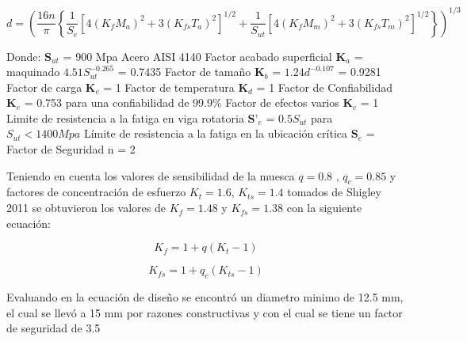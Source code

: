 \begin{equation}
    d = \left( \frac{16n}{\pi} \left\{ \frac{1}{S_e} [4(K_f M_a)^2 + 3(K_{fs} T_a)^2]^{1/2}   +       
                    \frac{1}{S_{ut}} [4(K_f M_m)^2 + 3(K_{fs} T_m)^2]^{1/2}     \right\} \right)^{1/3}
\end{equation}

Donde:\newline
$\textbf{S}_{ut}$ = 900 Mpa Acero AISI 4140\newline
Factor acabado superficial  $\textbf{K}_{a}$ = maquinado $4.51S_{ut}^{-0.265}$ = 0.7435 \newline
Factor de tamaño $\textbf{K}_{b}$ =  $1.24d^{-0.107}$ = 0.9281 \newline
Factor de carga $\textbf{K}_{c}$ = 1 \newline
Factor de temperatura $\textbf{K}_{d}$ = 1 \newline
Factor de Confiabilidad $\textbf{K}_{e}$ = 0.753    para una confiabilidad de 99.9\%\newline
Factor de efectos varios $\textbf{K}_{c}$ = 1 \newline
Limite de resistencia a la fatiga en viga rotatoria $\textbf{S'}_{e}$ = $0.5S_{ut}$ para $S_{ut} < 1400 Mpa$ \newline
Límite de resistencia a la fatiga en la ubicación crítica $\textbf{S}_{e}$ =\newline
Factor de Seguridad n = 2 \newline

Teniendo en cuenta los valores de sensibilidad de la muesca $q = 0.8$ , $ q_c = 0.85$ y factores de concentración de esfuerzo $K_t = 1.6$, $K_{ts} = 1.4$ tomados de Shigley 2011 se obtuvieron los valores de $K_f = 1.48 $ y $K_{fs}  = 1.38$ con la siguiente ecuación:

\begin{equation}
    K_f = 1 + q(K_t -1) 
\end{equation}

\begin{equation}
     K_{fs} = 1 + q_{c}(K_{ts} -1)
\end{equation}

Evaluando en la ecuación de diseño se encontró un diametro minimo de 12.5 mm, el cual se llevó a 15 mm por razones constructivas y con el cual se tiene un factor de seguridad de 3.5
